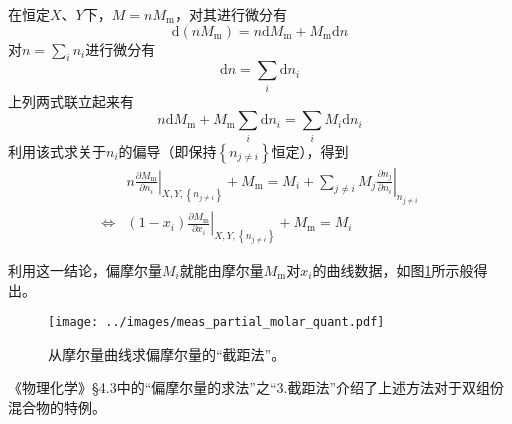 \documentclass[main.tex]{subfiles}
\begin{document}
在恒定$X$、$Y$下，$M=n M_\text{m}$，对其进行微分有
\[\mathrm{d}\left(nM_\text{m}\right)=n\mathrm{d}M_\text{m}+M_\text{m}\mathrm{d}n\]
对$n=\sum_i n_i$进行微分有
\[\mathrm{d}n=\sum_i\mathrm{d}n_i\]
上列两式联立起来有
\[n\mathrm{d}M_\text{m}+M_\text{m}\sum_i \mathrm{d}n_i=\sum_i M_i\mathrm{d}n_i\]
利用该式求关于$n_i$的偏导（即保持$\left\{n_{j\neq i}\right\}$恒定），得到
\begin{align*}
                  & n\left.\frac{\partial M_\text{m}}{\partial n_i}\right|_{X,Y,\left\{n_{j\neq i}\right\}}+M_\text{m}=M_i+\sum_{j\neq i}M_j\left.\frac{\partial n_j}{\partial n_i}\right|_{n_{j\neq i}} \\
  \Leftrightarrow & \left(1-x_i\right)\left.\frac{\partial M_\text{m}}{\partial x_i}\right|_{X,Y,\left\{n_{j\neq i}\right\}}+M_\text{m}=M_i
\end{align*}

利用这一结论，偏摩尔量$M_i$就能由摩尔量$M_\text{m}$对$x_i$的曲线数据，如图\ref{fig:meas_partial_molar_quant}所示般得出。

\begin{figure}[ht]
  \centering
  \texttt{[image: ../images/meas\_partial\_molar\_quant.pdf]}
  \caption{从摩尔量曲线求偏摩尔量的“截距法”。}
  \label{fig:meas_partial_molar_quant}
\end{figure}

《物理化学》\S 4.3中的“偏摩尔量的求法”之“3.截距法”介绍了上述方法对于双组份混合物的特例。
\end{document}
